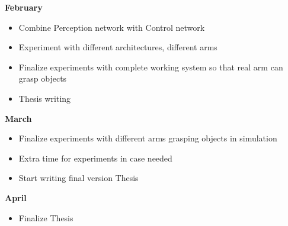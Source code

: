 \textbf{February}
\begin{itemize}
  \item Combine Perception network with Control network
  \item Experiment with different architectures, different arms
  \item Finalize experiments with complete working system so that real arm can grasp objects
  \item Thesis writing
\end{itemize}
\textbf{March}
\begin{itemize}
  \item Finalize experiments with different arms grasping objects in simulation 
  \item Extra time for experiments in case needed
  \item Start writing final version Thesis
\end{itemize}
\textbf{April}
\begin{itemize}
  \item Finalize Thesis
\end{itemize}








  
  
